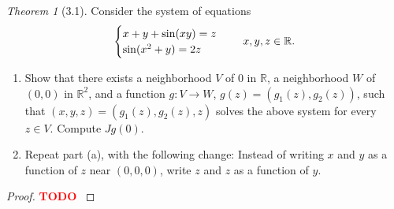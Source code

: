 \documentclass[12pt]{article}
\newcommand{\todo}{\textcolor{red}{\textbf{TODO }}}
\theoremstyle{remark}
\theoremstyle{named}
\newtheorem*{theorem}{Theorem}
\newcommand{\R}{\mathbb R}
\begin{document}
\begin{theorem}[3.1]
    Consider the system of equations
    \begin{align*}
        \begin{cases}
            x + y + \sin(xy) = z \\
            \sin(x^2 + y) = 2z
        \end{cases}
        \hspace*{4mm} x, y, z \in \R.
    \end{align*}
    \begin{enumerate}
        \item Show that there exists a neighborhood \(V\) of \(0\) in \(\R\), a neighborhood \(W\) of \((0, 0)\) in \(\R^2\), and a function \(g : V \to W\), \(g(z) = (g_1(z), g_2(z))\), such that \((x, y, z) = (g_1(z), g_2(z), z)\) solves the above system for every \(z \in V\). Compute \(J g(0)\).
        \item Repeat part (a), with the following change: Instead of writing \(x\) and \(y\) as a function of \(z\) near \((0, 0, 0)\), write \(z\) and \(z\) as a function of \(y\).
    \end{enumerate}
\end{theorem}

\begin{proof}
    \todo
\end{proof}
\end{document}
